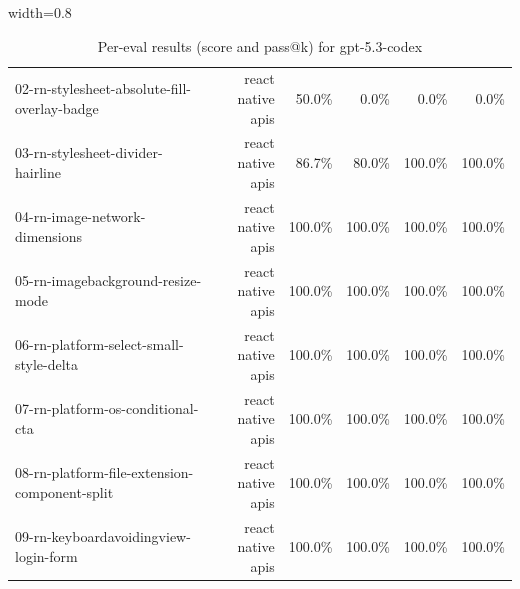 \begin{table}[htbp]
\begin{adjustbox}{width=0.8\textwidth}
\begin{tabular}{lrrrrr}
02-rn-stylesheet-absolute-fill-overlay-badge & react native apis & 50.0\% & 0.0\% & 0.0\% & 0.0\% \\
03-rn-stylesheet-divider-hairline & react native apis & 86.7\% & 80.0\% & 100.0\% & 100.0\% \\
04-rn-image-network-dimensions & react native apis & 100.0\% & 100.0\% & 100.0\% & 100.0\% \\
05-rn-imagebackground-resize-mode & react native apis & 100.0\% & 100.0\% & 100.0\% & 100.0\% \\
06-rn-platform-select-small-style-delta & react native apis & 100.0\% & 100.0\% & 100.0\% & 100.0\% \\
07-rn-platform-os-conditional-cta & react native apis & 100.0\% & 100.0\% & 100.0\% & 100.0\% \\
08-rn-platform-file-extension-component-split & react native apis & 100.0\% & 100.0\% & 100.0\% & 100.0\% \\
09-rn-keyboardavoidingview-login-form & react native apis & 100.0\% & 100.0\% & 100.0\% & 100.0\% \\
\bottomrule
\end{tabular}
\end{adjustbox}
\caption{Per-eval results (score and pass@k) for gpt-5.3-codex}
\end{table}
